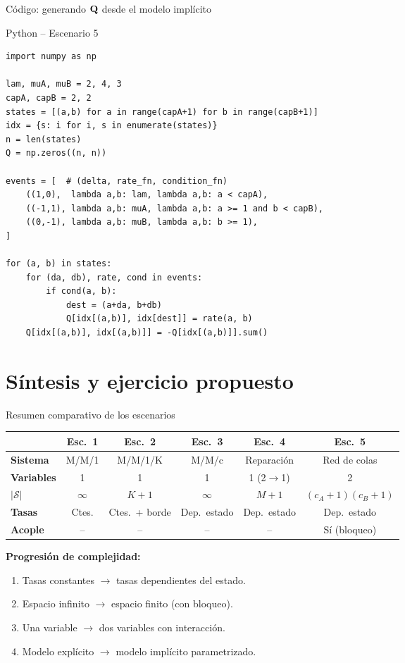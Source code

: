 \documentclass[aspectratio=1610, 9pt]{beamer}
\begin{document}
\begin{frame}[fragile]{C\'odigo: generando $\mathbf{Q}$ desde el modelo impl\'icito}
\begin{block}{Python -- Escenario 5}
\footnotesize
\begin{verbatim}
import numpy as np

lam, muA, muB = 2, 4, 3
capA, capB = 2, 2
states = [(a,b) for a in range(capA+1) for b in range(capB+1)]
idx = {s: i for i, s in enumerate(states)}
n = len(states)
Q = np.zeros((n, n))

events = [  # (delta, rate_fn, condition_fn)
    ((1,0),  lambda a,b: lam, lambda a,b: a < capA),
    ((-1,1), lambda a,b: muA, lambda a,b: a >= 1 and b < capB),
    ((0,-1), lambda a,b: muB, lambda a,b: b >= 1),
]

for (a, b) in states:
    for (da, db), rate, cond in events:
        if cond(a, b):
            dest = (a+da, b+db)
            Q[idx[(a,b)], idx[dest]] = rate(a, b)
    Q[idx[(a,b)], idx[(a,b)]] = -Q[idx[(a,b)]].sum()
\end{verbatim}
\end{block}
\end{frame}

\section{S\'intesis y ejercicio propuesto}

\begin{frame}{Resumen comparativo de los escenarios}
\footnotesize
\renewcommand{\arraystretch}{1.25}
\begin{tabular}{>{\bfseries}p{2.2cm} c c c c c}
\toprule
 & \textbf{Esc.\ 1} & \textbf{Esc.\ 2} & \textbf{Esc.\ 3} & \textbf{Esc.\ 4} & \textbf{Esc.\ 5} \\
\midrule
Sistema & M/M/1 & M/M/1/K & M/M/c & Reparaci\'on & Red de colas \\
Variables & 1 & 1 & 1 & 1 (2$\to$1) & 2 \\
$|\mathcal{S}|$ & $\infty$ & $K{+}1$ & $\infty$ & $M{+}1$ & $(c_A{+}1)(c_B{+}1)$ \\
Tasas & Ctes. & Ctes.\ + borde & Dep.\ estado & Dep.\ estado & Dep.\ estado \\
Acople & -- & -- & -- & -- & S\'i (bloqueo) \\
\bottomrule
\end{tabular}

\vspace{8pt}
\normalsize
\textbf{Progresión de complejidad:}
\begin{enumerate}
    \item Tasas constantes $\to$ tasas dependientes del estado.
    \item Espacio infinito $\to$ espacio finito (con bloqueo).
    \item Una variable $\to$ dos variables con interacci\'on.
    \item Modelo expl\'icito $\to$ modelo impl\'icito parametrizado.
\end{enumerate}
\end{frame}
\end{document}
